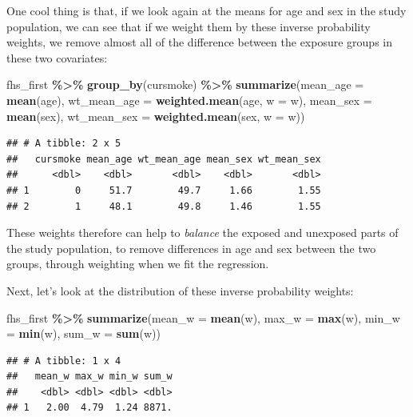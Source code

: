 \documentclass[
]{book}
\newenvironment{Shaded}{\begin{snugshade}}{\end{snugshade}}
\newcommand{\AttributeTok}[1]{\textcolor[rgb]{0.13,0.29,0.53}{#1}}
\newcommand{\FunctionTok}[1]{\textcolor[rgb]{0.13,0.29,0.53}{\textbf{#1}}}
\newcommand{\NormalTok}[1]{#1}
\newcommand{\SpecialCharTok}[1]{\textcolor[rgb]{0.81,0.36,0.00}{\textbf{#1}}}
\begin{document}
One cool thing is that, if we look again at the means for age and sex in the study population, we can see that if we weight them by these inverse probability weights, we remove almost all of the difference between the exposure groups in these two covariates:

\begin{Shaded}
\begin{Highlighting}[]
\NormalTok{fhs\_first }\SpecialCharTok{\%\textgreater{}\%} 
  \FunctionTok{group\_by}\NormalTok{(cursmoke) }\SpecialCharTok{\%\textgreater{}\%} 
  \FunctionTok{summarize}\NormalTok{(}\AttributeTok{mean\_age =} \FunctionTok{mean}\NormalTok{(age), }
            \AttributeTok{wt\_mean\_age =} \FunctionTok{weighted.mean}\NormalTok{(age, }\AttributeTok{w =}\NormalTok{ w), }
            \AttributeTok{mean\_sex =} \FunctionTok{mean}\NormalTok{(sex),}
            \AttributeTok{wt\_mean\_sex =} \FunctionTok{weighted.mean}\NormalTok{(sex, }\AttributeTok{w =}\NormalTok{ w))}
\end{Highlighting}
\end{Shaded}

\begin{verbatim}
## # A tibble: 2 x 5
##   cursmoke mean_age wt_mean_age mean_sex wt_mean_sex
##      <dbl>    <dbl>       <dbl>    <dbl>       <dbl>
## 1        0     51.7        49.7     1.66        1.55
## 2        1     48.1        49.8     1.46        1.55
\end{verbatim}

These weights therefore can help to \emph{balance} the exposed and unexposed parts of the study population, to remove differences in age and sex between the two groups, through weighting when we fit the regression.

Next, let's look at the distribution of these inverse probability weights:

\begin{Shaded}
\begin{Highlighting}[]
\NormalTok{fhs\_first }\SpecialCharTok{\%\textgreater{}\%}
  \FunctionTok{summarize}\NormalTok{(}\AttributeTok{mean\_w =} \FunctionTok{mean}\NormalTok{(w),}
            \AttributeTok{max\_w =} \FunctionTok{max}\NormalTok{(w),}
            \AttributeTok{min\_w =} \FunctionTok{min}\NormalTok{(w),}
            \AttributeTok{sum\_w =} \FunctionTok{sum}\NormalTok{(w))}
\end{Highlighting}
\end{Shaded}

\begin{verbatim}
## # A tibble: 1 x 4
##   mean_w max_w min_w sum_w
##    <dbl> <dbl> <dbl> <dbl>
## 1   2.00  4.79  1.24 8871.
\end{verbatim}
\end{document}
